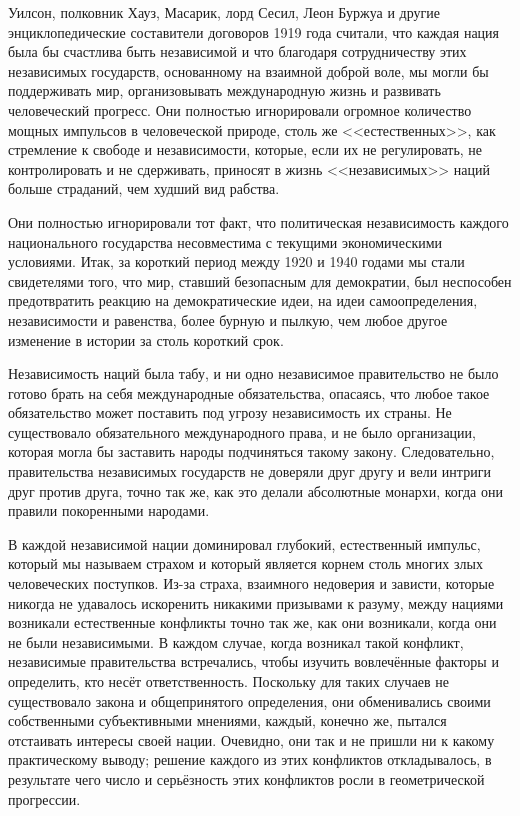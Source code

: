 Уилсон, полковник Хауз, Масарик, лорд Сесил, Леон Буржуа и другие энциклопедические составители  договоров 1919 года считали, что каждая нация была бы счастлива быть независимой и что благодаря сотрудничеству этих независимых государств, основанному на взаимной доброй воле, мы могли бы поддерживать мир, организовывать международную жизнь и развивать человеческий прогресс. Они полностью игнорировали огромное количество мощных импульсов в человеческой природе, столь же <<естественных>>, как стремление к свободе и независимости, которые, если их не регулировать, не контролировать и не сдерживать, приносят в жизнь <<независимых>> наций больше страданий, чем худший вид рабства.

Они полностью игнорировали тот факт, что политическая независимость каждого национального государства несовместима с текущими экономическими условиями. Итак, за короткий период между 1920 и 1940 годами мы стали свидетелями того, что мир, ставший безопасным для демократии, был неспособен предотвратить реакцию на демократические идеи, на идеи самоопределения, независимости и равенства, более бурную и пылкую, чем любое другое изменение в истории за столь короткий срок.

Независимость наций была табу, и ни одно независимое правительство не было готово брать на себя международные обязательства, опасаясь, что любое такое обязательство может поставить под угрозу независимость их страны. Не существовало обязательного международного права, и не было организации, которая могла бы заставить народы подчиняться такому закону. Следовательно, правительства независимых государств не доверяли друг другу и вели интриги друг против друга, точно так же, как это делали абсолютные монархи, когда они правили покоренными народами.

В каждой независимой нации доминировал глубокий, естественный импульс, который мы называем страхом и который является корнем столь многих злых человеческих поступков. Из-за страха, взаимного недоверия и зависти, которые никогда не удавалось искоренить никакими призывами к разуму, между нациями возникали естественные конфликты точно так же, как они возникали, когда они не были независимыми. В каждом случае, когда возникал такой конфликт, независимые правительства встречались, чтобы изучить вовлечённые факторы и определить, кто несёт ответственность. Поскольку для таких случаев не существовало закона и общепринятого определения, они обменивались своими собственными субъективными мнениями, каждый, конечно же, пытался отстаивать интересы своей нации. Очевидно, они так и не пришли ни к какому практическому выводу; решение каждого из этих конфликтов откладывалось, в результате чего число и серьёзность этих конфликтов росли в геометрической прогрессии.

